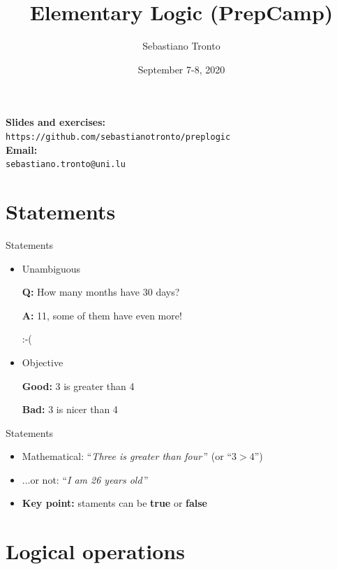 \documentclass[11pt]{beamer}
\author{Sebastiano Tronto}
\title{Elementary Logic (PrepCamp)}
\institute{uni.lu}
\date{September 7-8, 2020}
\makeatletter
\theoremstyle{definition}
\newcommand{\refgithub}{
    \textbf{Slides and exercises:} \\
    \hspace{20pt}\texttt{https://github.com/sebastianotronto/preplogic} \\
    \textbf{Email:} \\
    \hspace{20pt}\texttt{sebastiano.tronto@uni.lu}
}
\makeatother
\begin{document}
\begin{frame}
\titlepage
\end{frame}

\begin{frame}
    \tableofcontents
    \refgithub
\end{frame}


\section{Statements}
\begin{frame}{Statements}
\begin{itemize}
    \pause
 \item Unambiguous
   \pause
\begin{example}
\textbf{Q:} How many months have 30 days?
\pause

\textbf{A:} 11, some of them have even more!
\pause

:-(
\end{example}
\pause
 \item Objective
   \pause
\begin{example}
\textbf{Good:} 3 is greater than 4

\textbf{Bad:} 3 is nicer than 4
\end{example}
\end{itemize}
\end{frame}

\begin{frame}{Statements}
  \begin{itemize}
 \item Mathematical: ``\emph{Three is greater than four}\,''
                    (or ``$3 > 4$'')
 \item ...or not: ``\emph{I am 26 years old}\,''
 \item \textbf{Key point:} staments can be \textbf{true} or
                     \textbf{false}
\end{itemize}
\end{frame}



\section{Logical operations}
\end{document}

